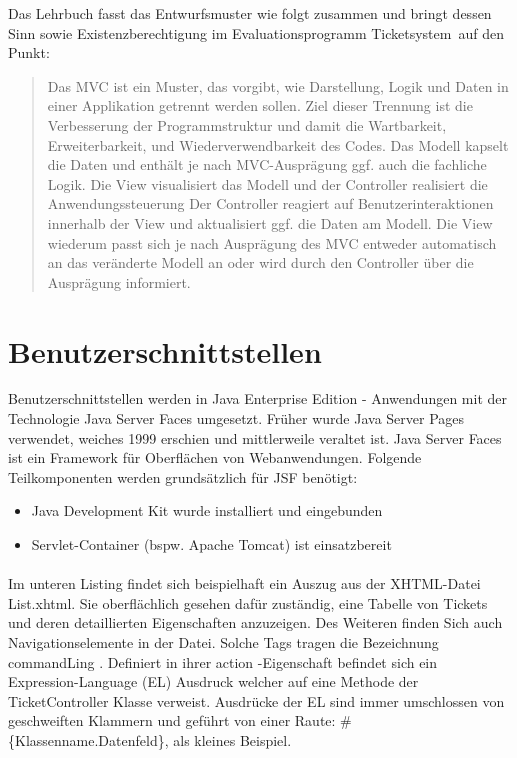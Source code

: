 Das Lehrbuch fasst das Entwurfsmuster wie folgt zusammen und bringt dessen Sinn sowie Existenzberechtigung im Evaluationsprogramm \glqq Ticketsystem\grqq\ auf den Punkt:

\blockcquote{javaeeworkshop}{
	Das MVC ist ein Muster, das vorgibt, wie Darstellung, Logik und Daten in einer Applikation getrennt werden sollen. Ziel dieser Trennung ist die Verbesserung der Programmstruktur und damit die Wartbarkeit, Erweiterbarkeit, und Wiederverwendbarkeit des Codes.
	Das Modell kapselt die Daten und enthält je nach MVC-Ausprägung ggf. auch die fachliche Logik. Die View visualisiert das Modell und der Controller realisiert die Anwendungssteuerung Der Controller reagiert auf Benutzerinteraktionen innerhalb der View und aktualisiert ggf. die Daten am Modell. Die View wiederum passt sich je nach Ausprägung des MVC entweder automatisch an das veränderte Modell an oder wird durch den Controller über die Ausprägung informiert.
}

\section{Benutzerschnittstellen} 
Benutzerschnittstellen werden in Java Enterprise Edition - Anwendungen mit der Technologie \glqq Java Server Faces \grqq umgesetzt. Früher wurde \glqq Java Server Pages \grqq verwendet, weiches 1999 erschien und mittlerweile veraltet ist. Java Server Faces ist ein Framework für Oberflächen von Webanwendungen. Folgende Teilkomponenten werden grundsätzlich für JSF benötigt:

\begin{itemize}
	\item Java Development Kit wurde installiert und eingebunden
	\item Servlet-Container (bspw. Apache Tomcat) ist einsatzbereit
\end{itemize}
\paragraph{}
Im unteren Listing findet sich beispielhaft ein Auszug aus der XHTML-Datei List.xhtml. Sie oberflächlich gesehen dafür zuständig, eine Tabelle von Tickets und deren detaillierten Eigenschaften anzuzeigen. Des Weiteren finden Sich auch Navigationselemente in der Datei. Solche Tags tragen die Bezeichnung \glqq commandLing \grqq. Definiert in ihrer \glqq action \grqq -Eigenschaft befindet sich ein Expression-Language (EL) Ausdruck welcher auf eine Methode der TicketController Klasse verweist. Ausdrücke der EL sind immer umschlossen von geschweiften Klammern und geführt von einer Raute: \#\{Klassenname.Datenfeld\}, als kleines Beispiel.
